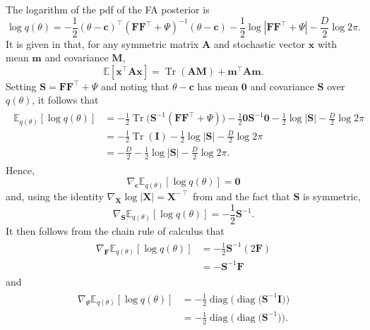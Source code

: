 \documentclass[msc,deptreport.inf]{infthesis} %
\newcommand{\matr}[1]{\mathbf{#1}}
\newcommand{\E}{\mathbb E}
\newcommand{\diag}{\mathop{\mathrm{diag}}}
\newcommand{\tr}{\mathop{\mathrm{Tr}}}
\begin{document}
The logarithm of the pdf of the FA posterior is
\begin{equation}
	\log q(\theta)
	= -\frac{1}{2} (\theta - \matr{c})^\intercal (\matr{FF}^{\intercal} + \Psi)^{-1} (\theta - \matr{c})  
	- \frac{1}{2} \log |\matr{FF}^{\intercal} + \Psi| 
	- \frac{D}{2} \log 2\pi.
\end{equation}
It is given in \cite{petersen2012} that, for any symmetric matrix $\matr{A}$ and stochastic vector $\matr{x}$ with mean $\matr{m}$ and covariance $\matr{M}$,
\begin{equation}\label{eqn:expectation_xTAx}
	\E [\matr{x}^\intercal \matr{A} \matr{x}] = \tr(\matr{A}\matr{M}) + \matr{m}^\intercal \matr{A} \matr{m}.
\end{equation}
Setting $\matr{S} = \matr{FF}^{\intercal} + \Psi$ and noting that $\theta - \matr{c}$ has mean $\matr{0}$ and covariance $\matr{S}$ over $q(\theta)$, it follows that
\begin{align}
\begin{split}\label{eqn:expectation_of_vi_dist}
	\E_{q(\theta)}[\log q(\theta)]
	& = -\frac{1}{2} \tr\big(\matr{S}^{-1} (\matr{FF}^{\intercal} + \Psi)\big) -\frac{1}{2} \matr{0} \matr{S}^{-1} \matr{0} 
	- \frac{1}{2} \log |\matr{S}| - \frac{D}{2} \log 2\pi \\
	& = -\frac{1}{2}\tr(\matr{I}) - \frac{1}{2} \log |\matr{S}| - \frac{D}{2} \log 2\pi \\
	& = -\frac{D}{2}  - \frac{1}{2} \log |\matr{S}| - \frac{D}{2} \log 2\pi.
\end{split}
\end{align}
Hence, 
\begin{equation}
	\nabla_\matr{c} \E_{q(\theta)} [\log q(\theta)] = \matr{0}
\end{equation}
and, using the identity $\nabla_\matr{X} \log |\matr{X}| = \matr{X}^{-\intercal}$ from \cite{petersen2012} and the fact that $\matr{S}$ is symmetric,
\begin{equation}
	\nabla_\matr{S} \E_{q(\theta)} [\log q(\theta)] = -\frac{1}{2} \matr{S}^{-1}.
\end{equation}
It then follows from the chain rule of calculus that
\begin{align}
\begin{split}\label{eqn:grad_vi_dist_wrt_F}
	\nabla_\matr{F} \E_{q(\theta)} [\log q(\theta)]
	& = -\frac{1}{2} \matr{S}^{-1} (2\matr{F}) \\
	& = -\matr{S}^{-1}\matr{F}
\end{split}
\end{align}
and
\begin{align}
\begin{split}\label{eqn:grad_vi_dist_wrt_Psi}
	\nabla_\Psi \E_{q(\theta)} [\log q(\theta)]
	& = -\frac{1}{2} \diag\big(\diag\big(\matr{S}^{-1} \matr{I}\big)\big) \\
	& = -\frac{1}{2} \diag\big(\diag\big(\matr{S}^{-1}\big)\big).
\end{split}
\end{align}
\end{document}

